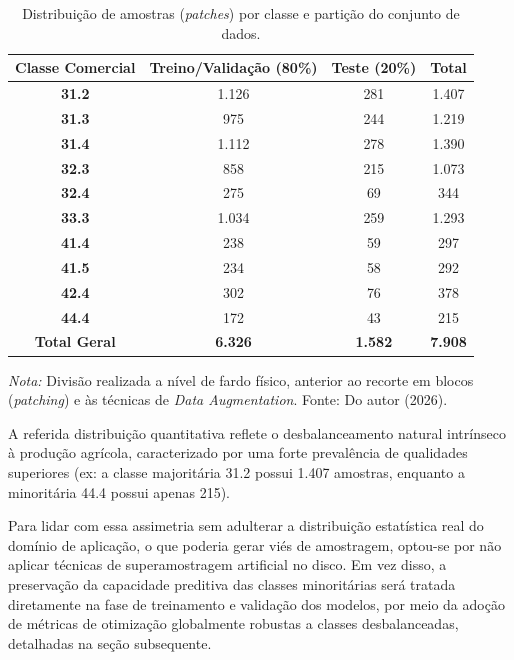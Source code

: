 \begin{table}[ht!]
    \centering
    \begin{threeparttable}
    \caption{Distribuição de amostras (\textit{patches}) por classe e partição do conjunto de dados.}
    \label{tab:distribuicao_classes}
    \begin{tabular}{c c c c}
        \hline
        \textbf{Classe Comercial} & \textbf{Treino/Validação (80\%)} & \textbf{Teste (20\%)} & \textbf{Total} \\
        \hline
        \textbf{31.2} & 1.126 & 281 & 1.407 \\
        \textbf{31.3} & 975 & 244 & 1.219 \\
        \textbf{31.4} & 1.112 & 278 & 1.390 \\
        \textbf{32.3} & 858 & 215 & 1.073 \\
        \textbf{32.4} & 275 & 69 & 344 \\
        \textbf{33.3} & 1.034 & 259 & 1.293 \\
        \textbf{41.4} & 238 & 59 & 297 \\
        \textbf{41.5} & 234 & 58 & 292 \\
        \textbf{42.4} & 302 & 76 & 378 \\
        \textbf{44.4} & 172 & 43 & 215 \\
        \hline
        \textbf{Total Geral} & \textbf{6.326} & \textbf{1.582} & \textbf{7.908} \\
        \hline
    \end{tabular}
    \begin{tablenotes}
        \small 
        \item \textit{Nota:} Divisão realizada a nível de fardo físico, anterior ao recorte em blocos (\textit{patching}) e às técnicas de \textit{Data Augmentation}. Fonte: Do autor (2026).
    \end{tablenotes}
    \end{threeparttable}
\end{table}

A referida distribuição quantitativa reflete o desbalanceamento natural intrínseco à produção agrícola, caracterizado por uma forte prevalência de qualidades superiores (ex: a classe majoritária 31.2 possui 1.407 amostras, enquanto a minoritária 44.4 possui apenas 215).

Para lidar com essa assimetria sem adulterar a distribuição estatística real do domínio de aplicação, o que poderia gerar viés de amostragem, optou-se por não aplicar técnicas de superamostragem artificial no disco. Em vez disso, a preservação da capacidade preditiva das classes minoritárias será tratada diretamente na fase de treinamento e validação dos modelos, por meio da adoção de métricas de otimização globalmente robustas a classes desbalanceadas, detalhadas na seção subsequente.
